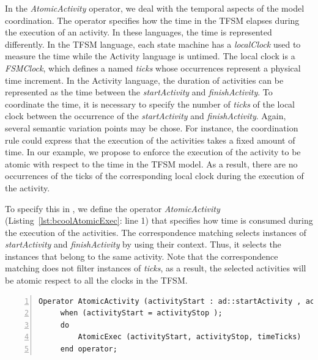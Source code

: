 	 	
In the \emph{AtomicActivity} operator, we deal with the temporal aspects of the model coordination. The operator specifies how the time in the TFSM elapses during the execution of an activity. In these languages, the time is represented differently. In the TFSM language, each state machine has a \emph{localClock} used to measure the time while the Activity language is untimed. The local clock is a \emph{FSMClock}, which defines a \dse named \emph{ticks} whose occurrences represent a physical time increment. In the Activity language, the duration of activities can be represented as the time between the \dse \emph{startActivity} and \dse \emph{finishActivity}. To coordinate the time, it is necessary to specify the number of \emph{ticks} of the local clock between the occurrence of the \dse \emph{startActivity} and \emph{finishActivity}. Again, several semantic variation points may be chose. For instance, the coordination rule could express that the execution of the activities takes a fixed amount of time. In our example, we propose to enforce the execution of the activity to be atomic with respect to the time in the TFSM model. As a result, there are no occurrences of the \dse ticks of the corresponding local clock during the execution of the activity.
	 
To specify this in \bcool, we define the operator \emph{AtomicActivity} (Listing~\ref{lst:bcoolAtomicExec}: line 1) that specifies how time is consumed during the execution of the activities. The correspondence matching selects instances of \dse \emph{startActivity} and \emph{finishActivity} by using their context. Thus, it selects the instances that belong to the same activity. Note that the correspondence matching does not filter instances of \dse \emph{ticks}, as a result, the selected activities will be atomic respect to all the clocks in the TFSM.
	 
	 
	 \begin{lstlisting}[language=bcool,
	 caption={\bcool specification of the \emph{AtomicActivity} operator},
	 label={lst:bcoolAtomicExec}, 
	 basicstyle=\scriptsize\ttfamily, backgroundcolor=\color{LGrey}, numbers=left, xleftmargin=2pt, firstnumber=1]
	 Operator AtomicActivity (activityStart : ad::startActivity , activityStop : ad::finishActivity, timeTicks : tfsm::ticks)
	 when (activityStart = activityStop );
	 do 
		 AtomicExec (activityStart, activityStop, timeTicks)
	 end operator;
	 \end{lstlisting}
	 
